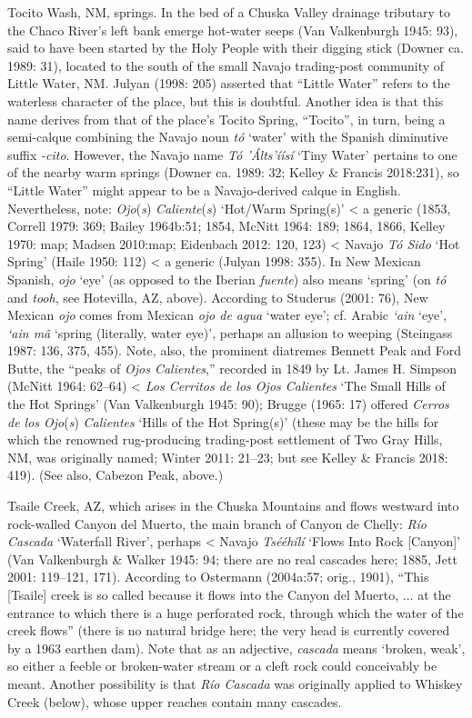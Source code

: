 Tocito Wash, NM, springs.  In the bed of a Chuska Valley drainage tributary to the Chaco River’s left bank emerge hot-water seeps (Van Valkenburgh 1945: 93), said to have been started by the Holy People with their digging stick (Downer ca. 1989: 31), located to the south of the small Navajo trading-post community of Little Water, NM.  Julyan (1998: 205) asserted that “Little Water” refers to the waterless character of the place, but this is doubtful.  Another idea is that this name derives from that of the place’s Tocito Spring, “Tocito”, in turn, being a semi-calque combining the Navajo noun \textit{tó }‘water’ with the Spanish diminutive suffix \textit{{}-cito}.  However, the Navajo name \textit{Tó ’Álts’íísí} ‘Tiny Water’ pertains to  one of the nearby  warm springs (Downer ca. 1989: 32; Kelley \& Francis 2018:231), so “Little Water” might appear to be a Navajo-derived calque in English.  Nevertheless, note: \textit{Ojo}(\textit{s})\textit{ Caliente}(\textit{s}) ‘Hot/Warm Spring(s)’ {\textless} a generic (1853, Correll 1979: 369; Bailey 1964b:51; 1854, McNitt 1964: 189; 1864, 1866, Kelley 1970: map; Madsen 2010:map; Eidenbach 2012: 120, 123) {\textless} Navajo \textit{Tó Sido} ‘Hot Spring’ (Haile 1950: 112) {\textless} a generic (Julyan 1998: 355).  In New Mexican Spanish, \textit{ojo} ‘eye’ (as opposed to the Iberian \textit{fuente}) also means ‘spring’ (on \textit{tó} and \textit{tooh}, see Hotevilla, AZ, above).  According to Studerus (2001: 76), New Mexican \textit{ojo} comes from Mexican \textit{ojo de agua} ‘water eye’; cf. Arabic \textit{‘ain} ‘eye’, \textit{‘ain mâ} ‘spring (literally, water eye)’, perhaps an allusion to weeping (Steingass 1987: 136, 375, 455).  Note, also, the prominent diatremes Bennett Peak and Ford Butte, the “peaks of \textit{Ojos Calientes},” recorded in 1849 by Lt. James H. Simpson (McNitt 1964: 62–64) {\textless} \textit{Los Cerritos de los Ojos Calientes} ‘The Small Hills of the Hot Springs’ (Van Valkenburgh 1945: 90); Brugge (1965: 17) offered \textit{Cerros de los Ojo}(\textit{s})\textit{ Calientes} ‘Hills of the Hot Spring(s)’ (these may be the hills for which the renowned rug-producing trading-post settlement of Two Gray Hills, NM, was originally named; Winter 2011: 21–23; but see Kelley \& Francis 2018: 419).  (See also, Cabezon Peak, above.)

Tsaile Creek, AZ, which arises in the Chuska Mountains and flows westward into rock-walled Canyon del Muerto, the main branch of Canyon de Chelly:  \textit{Río Cascada} ‘Waterfall River’, perhaps {\textless} Navajo \textit{Tsééhílí} ‘Flows Into Rock [Canyon]’ (Van Valkenburgh \& Walker 1945: 94; there are no real cascades here; 1885, Jett 2001: 119–121, 171).  According to Ostermann (2004a:57; orig., 1901), “This [Tsaile] creek is so called because it flows into the Canyon del Muerto, ... at the entrance to which there is a huge perforated rock, through which the water of the creek flows” (there is no natural bridge here; the very head is currently covered by a 1963 earthen dam).  Note that as an adjective, \textit{cascada} means ‘broken, weak’, so either a feeble or broken-water stream or a cleft rock could conceivably be meant.  Another possibility is that \textit{Río Cascada} was originally applied to Whiskey Creek (below), whose upper reaches contain many cascades.

